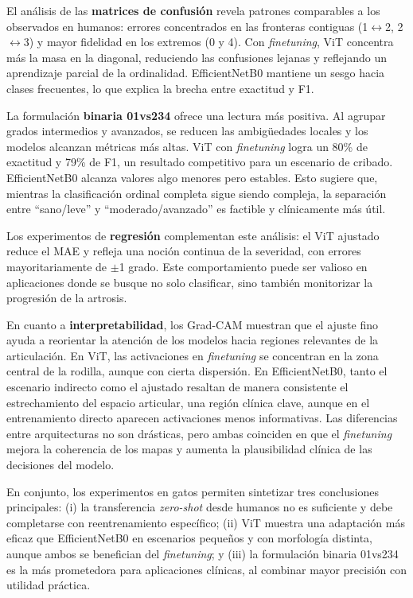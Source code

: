 \documentclass[11pt,spanish,listoffigures,listoftables]{tfgetsinf}
\begin{document}
El análisis de las \textbf{matrices de confusión} revela patrones comparables a los observados en humanos: errores concentrados en las fronteras contiguas (1$\leftrightarrow$2, 2$\leftrightarrow$3) y mayor fidelidad en los extremos (0 y 4). Con \emph{finetuning}, ViT concentra más la masa en la diagonal, reduciendo las confusiones lejanas y reflejando un aprendizaje parcial de la ordinalidad. EfficientNetB0 mantiene un sesgo hacia clases frecuentes, lo que explica la brecha entre exactitud y F1.

La formulación \textbf{binaria 01vs234} ofrece una lectura más positiva. Al agrupar grados intermedios y avanzados, se reducen las ambigüedades locales y los modelos alcanzan métricas más altas. ViT con \emph{finetuning} logra un 80\% de exactitud y 79\% de F1, un resultado competitivo para un escenario de cribado. EfficientNetB0 alcanza valores algo menores pero estables. Esto sugiere que, mientras la clasificación ordinal completa sigue siendo compleja, la separación entre “sano/leve” y “moderado/avanzado” es factible y clínicamente más útil.

Los experimentos de \textbf{regresión} complementan este análisis: el ViT ajustado reduce el MAE y refleja una noción continua de la severidad, con errores mayoritariamente de $\pm$1 grado. Este comportamiento puede ser valioso en aplicaciones donde se busque no solo clasificar, sino también monitorizar la progresión de la artrosis.

En cuanto a \textbf{interpretabilidad}, los Grad-CAM muestran que el ajuste fino ayuda a reorientar la atención de los modelos hacia regiones relevantes de la articulación. En ViT, las activaciones en \emph{finetuning} se concentran en la zona central de la rodilla, aunque con cierta dispersión. En EfficientNetB0, tanto el escenario indirecto como el ajustado resaltan de manera consistente el estrechamiento del espacio articular, una región clínica clave, aunque en el entrenamiento directo aparecen activaciones menos informativas. Las diferencias entre arquitecturas no son drásticas, pero ambas coinciden en que el \emph{finetuning} mejora la coherencia de los mapas y aumenta la plausibilidad clínica de las decisiones del modelo.

En conjunto, los experimentos en gatos permiten sintetizar tres conclusiones principales: (i) la transferencia \emph{zero-shot} desde humanos no es suficiente y debe completarse con reentrenamiento específico; (ii) ViT muestra una adaptación más eficaz que EfficientNetB0 en escenarios pequeños y con morfología distinta, aunque ambos se benefician del \emph{finetuning}; y (iii) la formulación binaria 01vs234 es la más prometedora para aplicaciones clínicas, al combinar mayor precisión con utilidad práctica.
\end{document}
